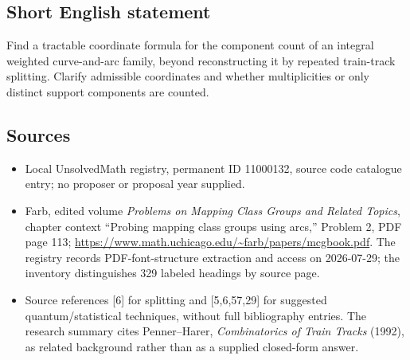 \documentclass[11pt]{article}
\begin{document}
\subsection{Short English statement}
Find a tractable coordinate formula for the component count of an integral weighted curve-and-arc family, beyond reconstructing it by repeated train-track splitting. Clarify admissible coordinates and whether multiplicities or only distinct support components are counted.
\subsection{Sources}
\begin{itemize}
\item Local UnsolvedMath registry, permanent ID 11000132, source code catalogue entry; no proposer or proposal year supplied.
\item Farb, edited volume \emph{Problems on Mapping Class Groups and Related Topics}, chapter context ``Probing mapping class groups using arcs,'' Problem 2, PDF page 113; \url{https://www.math.uchicago.edu/~farb/papers/mcgbook.pdf}. The registry records PDF-font-structure extraction and access on 2026-07-29; the inventory distinguishes 329 labeled headings by source page.
\item Source references [6] for splitting and [5,6,57,29] for suggested quantum/statistical techniques, without full bibliography entries. The research summary cites Penner--Harer, \emph{Combinatorics of Train Tracks} (1992), as related background rather than as a supplied closed-form answer.
\end{itemize}
\end{document}
